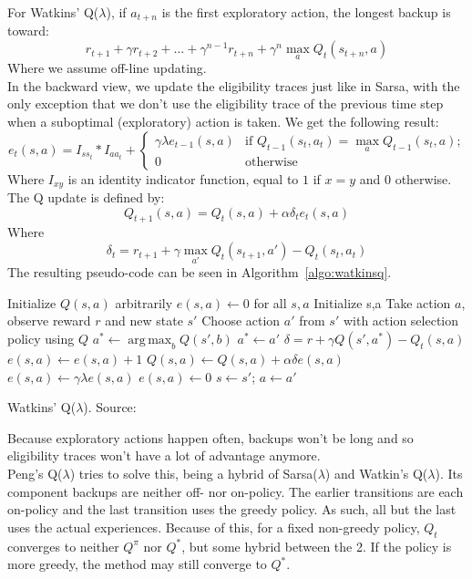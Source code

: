 \documentclass[a4paper, 11pt]{article}
\DeclareMathOperator*{\argmax}{arg\,max}
\begin{document}
For Watkins' Q($\lambda$), if $a_{t+n}$ is the first exploratory action, the longest backup is toward:
\begin{equation}
r_{t+1} + \gamma r_{t+2} + \dots + \gamma^{n-1} r_{t+n} + \gamma^n \max_a Q_t(s_{t+n},a)
\end{equation}
Where we assume off-line updating.\\
In the backward view, we update the eligibility traces just like in Sarsa, with the only exception that we don't use the eligibility trace of the previous time step when a suboptimal (exploratory) action is taken. We get the following result:
\begin{equation}
e_t(s,a) = I_{s s_t} * I_{a a_t} + \begin{cases}
	\gamma \lambda e_{t-1}(s,a) & \text{if $Q_{t-1}(s_t,a_t) = \max_a Q_{t-1}(s_t,a)$;} \\
    0 & \text{otherwise}
\end{cases}
\end{equation}
Where $I_{xy}$ is an identity indicator function, equal to $1$ if $x=y$ and $0$ otherwise. The Q update is defined by:
\begin{equation}
Q_{t+1}(s,a) = Q_t(s,a) + \alpha \delta_t e_t(s,a)
\end{equation}
Where
\begin{equation}
\delta_t = r_{t+1} + \gamma \max_{a'} Q_t(s_{t+1}, a') - Q_t(s_t,a_t)
\end{equation}
The resulting pseudo-code can be seen in Algorithm~\ref{algo:watkinsq}.\\
\begin{algorithm}[htb]
\DontPrintSemicolon
Initialize $Q(s,a)$ arbitrarily\;
$e(s,a) \gets 0$ for all $s,a$\;
 {
	Initialize s,a\;
	 {
    	Take action $a$, observe reward $r$ and new state $s'$\;
        Choose action $a'$ from $s'$ with action selection policy using $Q$\;
        $a^* \gets \argmax_b Q(s',b)$\;
         {
        	$a^* \gets a'$\;
        }
        $\delta = r + \gamma Q(s',a^*) - Q_t(s,a)$\;
        $e(s,a) \gets e(s,a) + 1$\;
         {
        	$Q(s,a) \gets Q(s,a) + \alpha \delta e(s,a)$\;
             {
            	$e(s,a) \gets \gamma \lambda e(s,a)$\;
            }{
            	$e(s,a) \gets 0$\;
            }
        }
        $s \gets s'$; $a \gets a'$\;
    }
}
\caption[Watkins' Q($\lambda$)]{Watkins' Q($\lambda$). Source: \cite{Sutton1998ReinforcementIntroduction}}
\label{algo:watkinsq}
\end{algorithm}
Because exploratory actions happen often, backups won't be long and so eligibility traces won't have a lot of advantage anymore.\\
Peng's Q($\lambda$) tries to solve this, being a hybrid of Sarsa($\lambda$) and Watkin's Q($\lambda$). Its component backups are neither off- nor on-policy. The earlier transitions are each on-policy and the last transition uses the greedy policy. As such, all but the last uses the actual experiences. Because of this, for a fixed non-greedy policy, $Q_t$ converges to neither $Q^{\pi}$ nor $Q^{*}$, but some hybrid between the 2. If the policy is more greedy, the method may still converge to $Q^{*}$.\\
\end{document}
